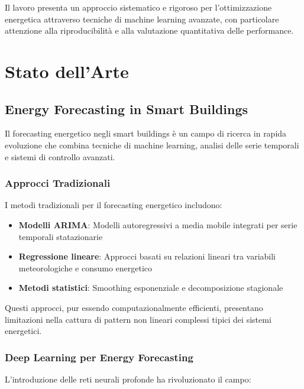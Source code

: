 \documentclass[12pt,a4paper,twoside]{report}
\begin{document}
Il lavoro presenta un approccio sistematico e rigoroso per l'ottimizzazione energetica attraverso tecniche di machine learning avanzate, con particolare attenzione alla riproducibilità e alla valutazione quantitativa delle performance.


\chapter{Stato dell'Arte}

\section{Energy Forecasting in Smart Buildings}

Il forecasting energetico negli smart buildings è un campo di ricerca in rapida evoluzione che combina tecniche di machine learning, analisi delle serie temporali e sistemi di controllo avanzati.

\subsection{Approcci Tradizionali}

I metodi tradizionali per il forecasting energetico includono:

\begin{itemize}
    \item \textbf{Modelli ARIMA}: Modelli autoregressivi a media mobile integrati per serie temporali statazionarie
    \item \textbf{Regressione lineare}: Approcci basati su relazioni lineari tra variabili meteorologiche e consumo energetico
    \item \textbf{Metodi statistici}: Smoothing esponenziale e decomposizione stagionale
\end{itemize}

Questi approcci, pur essendo computazionalmente efficienti, presentano limitazioni nella cattura di pattern non lineari complessi tipici dei sistemi energetici.

\subsection{Deep Learning per Energy Forecasting}

L'introduzione delle reti neurali profonde ha rivoluzionato il campo:
\end{document}
